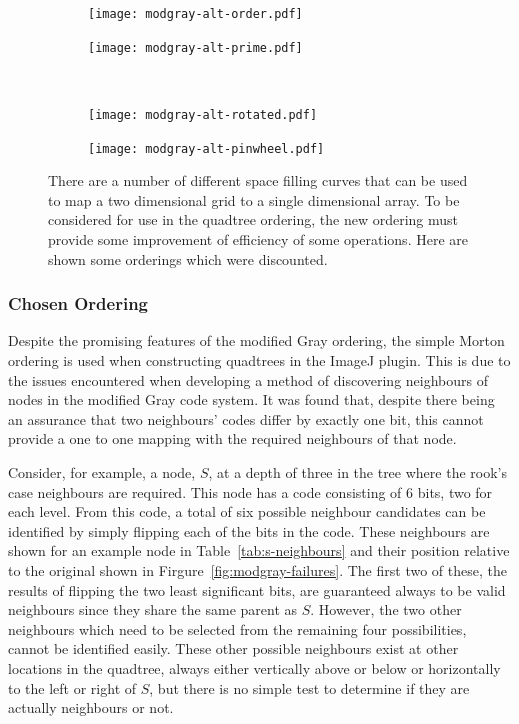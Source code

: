 \begin{figure}[tbhp]
	\centering
	\begin{subfigure}[b]{3.5cm}
		\texttt{[image: modgray-alt-order.pdf]}
		\caption{}\label{fig:modgray-alt-order.pdf}
	\end{subfigure}%
	\quad
	\begin{subfigure}[b]{3.5cm}
		\texttt{[image: modgray-alt-prime.pdf]}
		\caption{}\label{fig:modgray-alt-prime.pdf}
	\end{subfigure}
	\\[0.2cm]
	\begin{subfigure}[b]{3.5cm}
		\texttt{[image: modgray-alt-rotated.pdf]}
		\caption{}\label{fig:modgray-alt-rotated.pdf}
	\end{subfigure}%
	\quad
	\begin{subfigure}[b]{3.5cm}
		\texttt{[image: modgray-alt-pinwheel.pdf]}
		\caption{}\label{fig:modgray-alt-pinwheel.pdf}
	\end{subfigure}

	\caption[Alternative quadtree orderings.]{There are a number of different
		space filling curves that can be used to map a two dimensional grid to
		a single dimensional array. To be considered for use in the quadtree
		ordering, the new ordering must provide some improvement of efficiency
		of some operations. Here are shown some orderings which were
		discounted.}\label{fig:modgray-2-alternatives}
\end{figure}

\subsubsection{Chosen Ordering}
\label{ssub:Chosen Ordering}

Despite the promising features of the modified Gray ordering, the simple Morton
ordering is used when constructing quadtrees in the ImageJ plugin. This is due
to the issues encountered when developing a method of discovering neighbours of
nodes in the modified Gray code system. It was found that, despite there being
an assurance that two neighbours' codes differ by exactly one bit, this cannot
provide a one to one mapping with the required neighbours of that node.

Consider, for example, a node, $S$, at a depth of three in the tree where the
rook's case neighbours are required. This node has a code consisting of 6 bits,
two for each level. From this code, a total of six possible neighbour
candidates can be identified by simply flipping each of the bits in the code.
These neighbours are shown for an example node in Table~\ref{tab:s-neighbours}
and their position relative to the original shown in
Firgure~\ref{fig:modgray-failures}. The first two of these, the results of
flipping the two least significant bits, are guaranteed always to be valid
neighbours since they share the same parent as $S$. However, the two other
neighbours which need to be selected from the remaining four possibilities,
cannot be identified easily.  These other possible neighbours exist at other
locations in the quadtree, always either vertically above or below or
horizontally to the left or right of $S$, but there is no simple test to
determine if they are actually neighbours or not.

